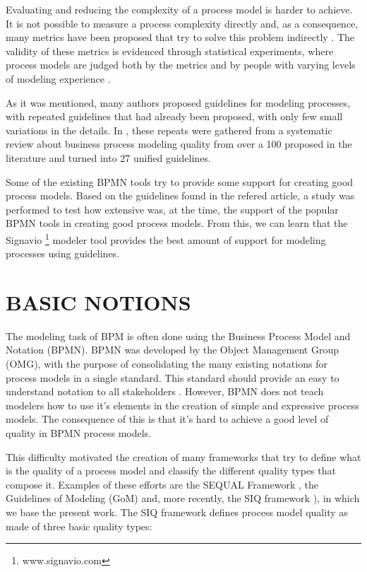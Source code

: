 \documentclass[a4paper,twoside]{article}
\begin{document}
Evaluating and reducing the complexity of a process model is harder to achieve. It is not possible to measure a process complexity directly and, as a consequence, many metrics have been proposed that try to solve this problem indirectly \cite{Vanderfeesten2007} \cite{Mendling2008b} \cite{Gruhn2006}. The validity of these metrics is evidenced through statistical experiments, where process models are judged both by the metrics and by people with varying levels of modeling experience \cite{Cardoso2006a} \cite{Sanchez-Gonzalez2008}.

As it was mentioned, many authors proposed guidelines for modeling processes, with repeated guidelines that had already been proposed, with only few small variations in the details. In \cite{Moreno-MontesdeOca2014}, these repeats were gathered from a systematic review about business process modeling quality from over a 100 proposed in the literature and turned into 27 unified guidelines.  

Some of the existing BPMN tools try to provide some support for creating good process models. Based on the guidelines found in the refered article, a study \cite{MoniqueSnoeckIsel2015} was performed to test how extensive was, at the time, the support of the popular BPMN tools in creating good process models. From this, we can learn that the Signavio \footnote{www.signavio.com} modeler tool provides the best amount of support for modeling processes using guidelines. 


\section{BASIC NOTIONS}\label{Fundamentals}\label{Background}

\noindent The modeling task of BPM is often done using the Business Process Model and Notation (BPMN). BPMN was developed by the Object Management Group (OMG), with the purpose of consolidating the many existing notations for process models in a single standard. This standard should provide an easy to understand notation to all stakeholders \cite{OMGObjectManagementGroup2015}. However, BPMN does not teach modelers how to use it's elements in the creation of simple and expressive process models. The consequence of this is that it's hard to achieve a good level of quality in BPMN process models.


This difficulty motivated the creation of many frameworks that try to define what is the quality of a process model and classify the different quality types that compose it. Examples of these efforts are the SEQUAL Framework \cite{krogstie2012}, the Guidelines of Modeling (GoM) \cite{Schuette1998} and, more recently, the SIQ framework \cite{Reijers2015}), in which we base the present work. The SIQ framework defines process model quality as made of three basic quality types:
\end{document}
